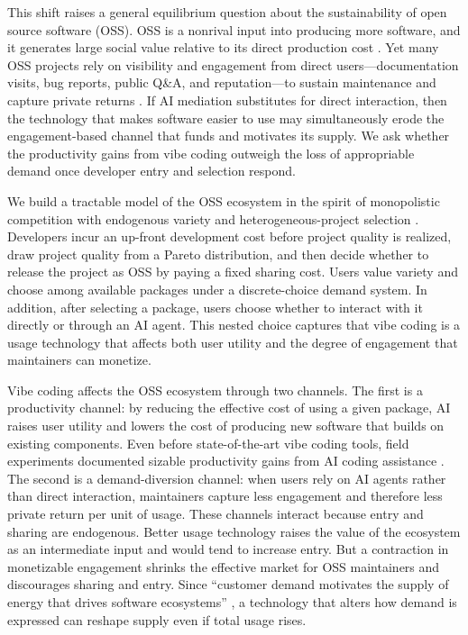 \documentclass[11pt,a4paper]{article}
\theoremstyle{definition}
\theoremstyle{remark}
\begin{document}
This shift raises a general equilibrium question about the sustainability of open source software (OSS). OSS is a nonrival input into producing more software, and it generates large social value relative to its direct production cost \citep{hoffmann-nagle-zhou-2024}. Yet many OSS projects rely on visibility and engagement from direct users---documentation visits, bug reports, public Q\&A, and reputation---to sustain maintenance and capture private returns \citep{lerner-tirole-2002,jones-2020-eseur}. If AI mediation substitutes for direct interaction, then the technology that makes software easier to use may simultaneously erode the engagement-based channel that funds and motivates its supply. We ask whether the productivity gains from vibe coding outweigh the loss of appropriable demand once developer entry and selection respond.

We build a tractable model of the OSS ecosystem in the spirit of monopolistic competition with endogenous variety \citep{krugman-1980} and heterogeneous-project selection \citep{melitz-2003}. Developers incur an up-front development cost before project quality is realized, draw project quality from a Pareto distribution, and then decide whether to release the project as OSS by paying a fixed sharing cost. Users value variety and choose among available packages under a discrete-choice demand system. In addition, after selecting a package, users choose whether to interact with it directly or through an AI agent. This nested choice captures that vibe coding is a usage technology that affects both user utility and the degree of engagement that maintainers can monetize.

Vibe coding affects the OSS ecosystem through two channels. The first is a productivity channel: by reducing the effective cost of using a given package, AI raises user utility and lowers the cost of producing new software that builds on existing components. Even before state-of-the-art vibe coding tools, field experiments documented sizable productivity gains from AI coding assistance \citep{peng-2023-copilot-productivity,cui-demirer-jaffe-musolff-peng-salz-2025}. The second is a demand-diversion channel: when users rely on AI agents rather than direct interaction, maintainers capture less engagement and therefore less private return per unit of usage. These channels interact because entry and sharing are endogenous. Better usage technology raises the value of the ecosystem as an intermediate input and would tend to increase entry. But a contraction in monetizable engagement shrinks the effective market for OSS maintainers and discourages sharing and entry. Since ``customer demand motivates the supply of energy that drives software ecosystems'' \citep{jones-2020-eseur}, a technology that alters how demand is expressed can reshape supply even if total usage rises.
\end{document}
